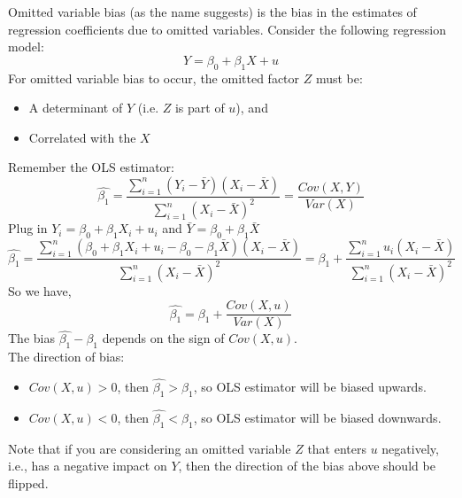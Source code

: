 \documentclass{./../../Latex/handout}
\begin{document}
\thispagestyle{plain}

Omitted variable bias (as the name suggests) is the bias in the estimates of regression coefficients due to omitted variables. Consider the following regression model:
$$ Y = \beta_0 + \beta_1 X + u $$
For omitted variable bias to occur, the omitted factor $Z$ must be:
\begin{itemize}
  \item A determinant of $Y$ (i.e. $Z$ is part of $u$), and
  \item Correlated with the $X$ 
\end{itemize}

Remember the OLS estimator:
 $$ \hat{\beta_1} = \frac{ \sum_{i=1}^n(Y_i - \bar{Y})(X_i-\bar{X})}{ \sum_{i=1}^n(X_i - \bar{X})^2 } = \frac{Cov(X,Y)}{Var(X)} $$
Plug in $Y_i = \beta_0 + \beta_1 X_i + u_i$ and $\bar{Y}= \beta_0 + \beta_1 \bar{X} $
 $$ \hat{\beta_1} =  \frac{ \sum_{i=1}^n(\beta_0 + \beta_1 X_i + u_i - \beta_0 - \beta_1 \bar{X})(X_i-\bar{X})}{ \sum_{i=1}^n(X_i - \bar{X})^2 } = \beta_1 + \frac{ \sum_{i=1}^n u_i (X_i-\bar{X})}{ \sum_{i=1}^n(X_i - \bar{X})^2 }  $$
 So we have, 
 $$ \hat{\beta_1} = \beta_1 + \frac{Cov(X,u)}{Var(X)} $$
 The bias $ \hat{\beta_1}- \beta_1$ depends on the sign of $Cov(X,u)$. \\
 
 The direction of bias:
\begin{itemize}
  \item $Cov(X,u)>0$, then $\hat{\beta_1}>\beta_1$, so OLS estimator will be biased upwards. 
  \item $Cov(X,u)<0$, then $\hat{\beta_1}<\beta_1$, so OLS estimator will be biased downwards.
\end{itemize}
Note that if you are considering an omitted variable $Z$ that enters $u$ negatively, i.e., has a negative impact on $Y$, then the direction of the bias above should be flipped. 
\end{document}
